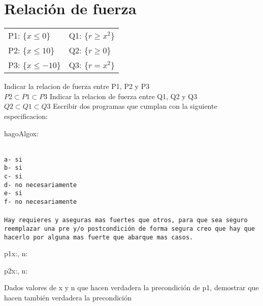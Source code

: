 \documentclass[10pt,a4paper]{article}
\begin{document}
\section*{Relación de fuerza}
\begin{tabularx}{\textwidth}{XX}
    P1: \{$x\leq 0$\} & Q1: \{$r\geq x^2$\}\\
    P2: \{$x\leq 10$\} & Q2: \{$r\geq 0$\}\\
    P3: \{$x\leq -10$\} & Q3: \{$r = x^2$\}\\
\end{tabularx}
\salto{\baselineskip}
Indicar la relacion de fuerza entre P1, P2 y P3\\
{\color{red}$P2 \subset P1 \subset P3$}
\salto{\baselineskip}
Indicar la relacion de fuerza entre Q1, Q2 y Q3\\
{\color{red}$Q2 \subset Q1 \subset Q3$}
\salto{\baselineskip}
Escribir dos programas que cumplan con la siguiente especificacion:
\begin{proc}{hagoAlgo}{\In x:\float}{\float}
\end{proc}
\\
\texttt{{\color{red}a- si
\\b- si
\\c- si
\\d- no necesariamente
\\e- si
\\f- no necesariamente
\\
\\Hay requieres y aseguras mas fuertes que otros, para que sea seguro reemplazar una pre y/o postcondición de forma segura creo que hay que hacerlo por alguna mas fuerte que abarque mas casos.
}}
\color{black}
\begin{proc}{p1}{\In x:\ent, \In n:\ent}{\ent}
\end{proc}
\begin{proc}{p2}{\In x:\ent, \In n:\ent}{\ent}
\end{proc}
Dados valores de x y n que hacen verdadera la precondición de p1, demostrar que hacen también verdadera la precondición
\end{document}
